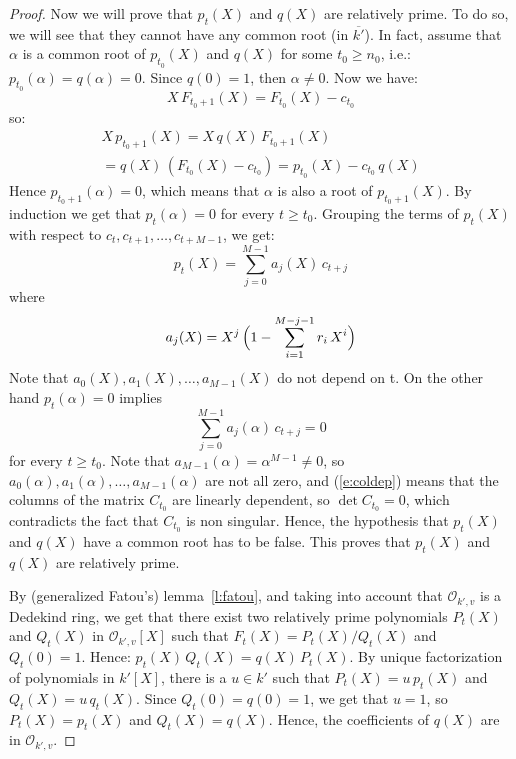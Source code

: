 \begin{proof}
Now we will prove that $p_t(X)$ and $q(X)$ are relatively 
prime. To do so, we will see that they cannot have any 
common root (in $\overline {k'}$). In fact, assume 
that $\alpha$ is a common root of $p_{t_0}(X)$ and $q(X)$ 
for some $t_0 \geq n_0$, i.e.: 
$p_{t_0}(\alpha) = q(\alpha) = 0$. 
Since $q(0)=1$, then $\alpha \neq 0$. Now we have:
\begin{equation}
X\,F_{t_0+1}(X) = F_{t_0}(X) - c_{t_0}
\end{equation}
so:
\begin{multline}
X\,p_{t_0+1}(X) = X\,q(X)\,F_{t_0+1}(X) \\
= q(X)\,(F_{t_0}(X) - c_{t_0}) = p_{t_0}(X) - c_{t_0}\,q(X)
\end{multline}
Hence $p_{t_0+1}(\alpha) = 0$, which means that $\alpha$ is 
also a root of $p_{t_0+1}(X)$. By induction we get that 
$p_t(\alpha) = 0$ for every $t \geq t_0$. Grouping the 
terms of $p_t(X)$ with respect to $c_t,c_{t+1},\dots,c_{t+M-1}$, 
we get:
\begin{equation}
p_t(X) = \sum_{j=0}^{M-1} a_j(X)\,c_{t+j}
\end{equation}
where 
\begin{equation}
a_j(X) = X^j\,\Bigl( 1 - \sum_{i=1}^{M-j-1} r_i\,X^i \Bigr)
\end{equation}
Note that $a_0(X),a_1(X),\dots,a_{M-1}(X)$ do not depend on t. 
On the other hand $p_t(\alpha)=0$ implies
\begin{equation}
\label{e:coldep}
\sum_{j=0}^{M-1} a_j(\alpha)\,c_{t+j} = 0
\end{equation}
for every $t \geq t_0$. Note that $a_{M-1}(\alpha)=\alpha^{M-1}
\neq 0$, so $a_0(\alpha),a_1(\alpha),\dots,a_{M-1}(\alpha)$ 
are not all zero, and (\ref{e:coldep}) means that the columns 
of the matrix $C_{t_0}$ are linearly dependent, so 
$\det C_{t_0}=0$, which contradicts the fact that $C_{t_0}$ 
is non singular. Hence, the hypothesis that $p_t(X)$ and 
$q(X)$ have a common root has to be false. This proves that 
$p_t(X)$ and $q(X)$ are relatively prime. 

By (generalized Fatou's) lemma~\ref{l:fatou}, 
and taking into account that 
$\mathcal O_{k',v}$ is a Dedekind ring, 
we get that there exist two relatively prime 
polynomials $P_t(X)$ and $Q_t(X)$ in 
$\mathcal O_{k',v}[X]$ such that 
$F_t(X) = P_t(X)/Q_t(X)$ and $Q_t(0)=1$. Hence: 
$p_t(X)\,Q_t(X) = q(X)\,P_t(X)$. By unique factorization 
of polynomials in $k'[X]$, there is a $u \in k'$ such that 
$P_t(X) = u\,p_t(X)$ and $Q_t(X) = u\,q_t(X)$. Since 
$Q_t(0)=q(0)=1$, we get that $u=1$, so 
$P_t(X) = p_t(X)$ and $Q_t(X) = q(X)$. 
Hence, the coefficients of $q(X)$ are in 
$\mathcal O_{k',v}$. 

\end{proof}


